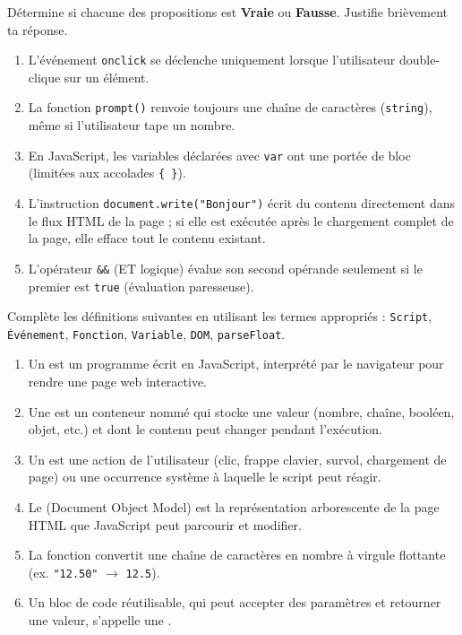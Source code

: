 \documentclass[11pt]{article}
\begin{document}
\begin{exercice}
Détermine si chacune des propositions est \textbf{Vraie} ou \textbf{Fausse}. Justifie brièvement ta réponse.
\begin{enumerate}
    \item L'événement \texttt{onclick} se déclenche uniquement lorsque l'utilisateur double-clique sur un élément.
    \item La fonction \texttt{prompt()} renvoie toujours une chaîne de caractères (\texttt{string}), même si l'utilisateur tape un nombre.
    \item En JavaScript, les variables déclarées avec \texttt{var} ont une portée de bloc (limitées aux accolades \texttt{\{ \}}).
    \item L'instruction \texttt{document.write("Bonjour")} écrit du contenu directement dans le flux HTML de la page ; si elle est exécutée après le chargement complet de la page, elle efface tout le contenu existant.
    \item L'opérateur \texttt{\&\&} (ET logique) évalue son second opérande seulement si le premier est \texttt{true} (évaluation paresseuse).
\end{enumerate}
\end{exercice}

\begin{exercice}
Complète les définitions suivantes en utilisant les termes appropriés : \texttt{Script}, \texttt{Événement}, \texttt{Fonction}, \texttt{Variable}, \texttt{DOM}, \texttt{parseFloat}.
\begin{enumerate}
    \item Un \underline{\hspace{4cm}} est un programme écrit en JavaScript, interprété par le navigateur pour rendre une page web interactive.
    \item Une \underline{\hspace{4cm}} est un conteneur nommé qui stocke une valeur (nombre, chaîne, booléen, objet, etc.) et dont le contenu peut changer pendant l'exécution.
    \item Un \underline{\hspace{4cm}} est une action de l'utilisateur (clic, frappe clavier, survol, chargement de page) ou une occurrence système à laquelle le script peut réagir.
    \item Le \underline{\hspace{4cm}} (Document Object Model) est la représentation arborescente de la page HTML que JavaScript peut parcourir et modifier.
    \item La fonction \underline{\hspace{4cm}} convertit une chaîne de caractères en nombre à virgule flottante (ex. \texttt{"12.50"} $\to$ \texttt{12.5}).
    \item Un bloc de code réutilisable, qui peut accepter des paramètres et retourner une valeur, s'appelle une \underline{\hspace{4cm}}.
\end{enumerate}
\end{exercice}
\end{document}

